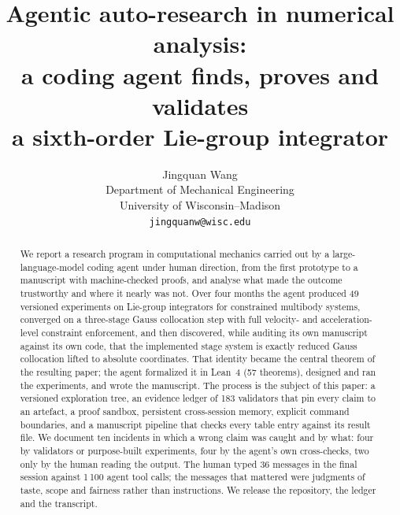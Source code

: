 \documentclass[11pt]{article}
\title{Agentic auto-research in numerical analysis:\\
a coding agent finds, proves and validates\\
a sixth-order Lie-group integrator}
\author{Jingquan Wang \\
  Department of Mechanical Engineering \\
  University of Wisconsin--Madison \\
  \texttt{jingquanw@wisc.edu}}
\providecommand{\nHuman}{36}\providecommand{\nTurns}{1\,700}\providecommand{\nTools}{1\,100}
\begin{document}
\maketitle

\begin{abstract}
We report a research program in computational mechanics carried out by a large-language-model
coding agent under human direction, from the first prototype to a manuscript with machine-checked
proofs, and analyse what made the outcome trustworthy and where it nearly was not. Over four months
the agent produced 49 versioned experiments on Lie-group integrators for constrained multibody
systems, converged on a three-stage Gauss collocation step with full velocity- and
acceleration-level constraint enforcement, and then discovered, while auditing its own manuscript
against its own code, that the implemented stage system is exactly reduced Gauss collocation lifted
to absolute coordinates. That identity became the central theorem of the resulting paper; the agent
formalized it in Lean~4 (57 theorems), designed and ran the experiments, and wrote the manuscript.
The process is the subject of this paper: a versioned exploration tree, an evidence ledger of 183
validators that pin every claim to an artefact, a proof sandbox, persistent cross-session memory,
explicit command boundaries, and a manuscript pipeline that checks every table entry against its
result file. We document ten incidents in which a wrong claim was caught and by what: four by
validators or purpose-built experiments, four by the agent's own cross-checks, two only by the human
reading the output. The human typed \nHuman{} messages in the final session against \nTools{} agent tool calls; the messages that mattered were judgments of taste, scope and fairness
rather than instructions. We release the repository, the ledger and the transcript.
\end{abstract}















\appendix
\raggedbottom
\renewcommand{\dbltopfraction}{0.95}\renewcommand{\dblfloatpagefraction}{0.85}\setcounter{dbltopnumber}{3}

\end{document}
